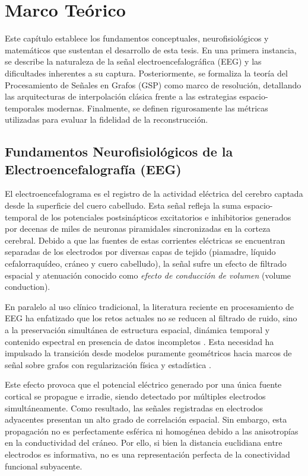 \chapter{Marco Teórico}

Este capítulo establece los fundamentos conceptuales, neurofisiológicos y matemáticos que sustentan el desarrollo de esta tesis. En una primera instancia, se describe la naturaleza de la señal electroencefalográfica (EEG) y las dificultades inherentes a su captura. Posteriormente, se formaliza la teoría del Procesamiento de Señales en Grafos (GSP) como marco de resolución, detallando las arquitecturas de interpolación clásica frente a las estrategias espacio-temporales modernas. Finalmente, se definen rigurosamente las métricas utilizadas para evaluar la fidelidad de la reconstrucción.

\section{Fundamentos Neurofisiológicos de la Electroencefalografía (EEG)}

El electroencefalograma es el registro de la actividad eléctrica del cerebro captada desde la superficie del cuero cabelludo. Esta señal refleja la suma espacio-temporal de los potenciales postsinápticos excitatorios e inhibitorios generados por decenas de miles de neuronas piramidales sincronizadas en la corteza cerebral. Debido a que las fuentes de estas corrientes eléctricas se encuentran separadas de los electrodos por diversas capas de tejido (piamadre, líquido cefalorraquídeo, cráneo y cuero cabelludo), la señal sufre un efecto de filtrado espacial y atenuación conocido como \textit{efecto de conducción de volumen} (volume conduction).

En paralelo al uso clínico tradicional, la literatura reciente en procesamiento de EEG ha enfatizado que los retos actuales no se reducen al filtrado de ruido, sino a la preservación simultánea de estructura espacial, dinámica temporal y contenido espectral en presencia de datos incompletos \cite{sharma_emerging_2024}. Esta necesidad ha impulsado la transición desde modelos puramente geométricos hacia marcos de señal sobre grafos con regularización física y estadística \cite{calazans_machine_2024, li_graph_2023}.

Este efecto provoca que el potencial eléctrico generado por una única fuente cortical se propague e irradie, siendo detectado por múltiples electrodos simultáneamente. Como resultado, las señales registradas en electrodos adyacentes presentan un alto grado de correlación espacial. Sin embargo, esta propagación no es perfectamente esférica ni homogénea debido a las anisotropías en la conductividad del cráneo. Por ello, si bien la distancia euclidiana entre electrodos es informativa, no es una representación perfecta de la conectividad funcional subyacente.


